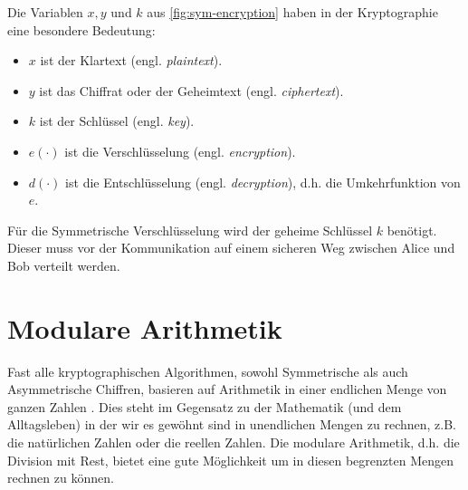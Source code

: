 

\noindent
Die Variablen $x, y$ und $k$ aus \autoref{fig:sym-encryption} haben in der
Kryptographie eine besondere Bedeutung:

\begin{itemize}
  \item $x$ ist der Klartext (engl. \textit{plaintext}).
  \item $y$ ist das Chiffrat oder der Geheimtext (engl. \textit{ciphertext}).
  \item $k$ ist der Schlüssel (engl. \textit{key}).
  \item $e(\cdot)$ ist die Verschlüsselung (engl. \textit{encryption}).
  \item $d(\cdot)$ ist die Entschlüsselung (engl. \textit{decryption}),
        d.h. die Umkehrfunktion von $e$.
\end{itemize}

\noindent
Für die Symmetrische Verschlüsselung wird der geheime Schlüssel $k$ benötigt. Dieser
muss vor der Kommunikation auf einem sicheren Weg zwischen Alice und Bob verteilt werden.

\section{Modulare Arithmetik}
Fast alle kryptographischen Algorithmen, sowohl Symmetrische als auch Asymmetrische Chiffren,
basieren auf Arithmetik in einer endlichen Menge von ganzen Zahlen \parencite[13]{BOOK:crypto}.
Dies steht im Gegensatz zu der Mathematik (und dem Alltagsleben)
in der wir es gewöhnt sind in unendlichen
Mengen zu rechnen, z.B. die natürlichen Zahlen oder die reellen Zahlen. Die modulare Arithmetik,
d.h. die Division mit Rest, bietet eine gute Möglichkeit um in diesen begrenzten Mengen rechnen
zu können.

